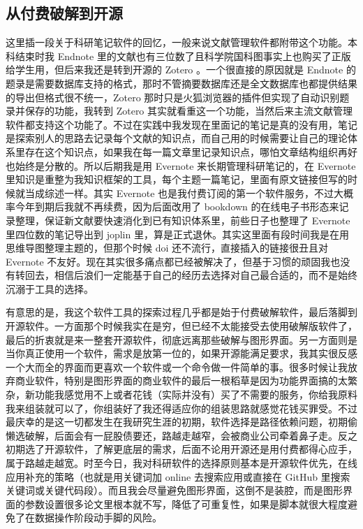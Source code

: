 \documentclass[
]{book}
\begin{document}
\hypertarget{ux4eceux4ed8ux8d39ux7834ux89e3ux5230ux5f00ux6e90}{%
\subsection{从付费破解到开源}\label{ux4eceux4ed8ux8d39ux7834ux89e3ux5230ux5f00ux6e90}}

这里插一段关于科研笔记软件的回忆，一般来说文献管理软件都附带这个功能。本科结束时我 Endnote 里的文献也有三位数了且科学院国科图事实上也购买了正版给学生用，但后来我还是转到开源的 Zotero 。一个很直接的原因就是 Endnote 的题录是需要数据库支持的格式，那时不管摘要数据库还是全文数据库也都提供结果的导出但格式很不统一，Zotero 那时只是火狐浏览器的插件但实现了自动识别题录并保存的功能，我转到 Zotero 其实就看重这一个功能，当然后来主流文献管理软件都支持这个功能了。不过在实践中我发现在里面记的笔记是真的没有用，笔记是探索别人的思路去记录每个文献的知识点，而自己用的时候需要让自己的理论体系里存在这个知识点，如果我在每一篇文章里记录知识点，哪怕文章结构组织再好也始终是分散的。所以后期我是用 Evernote 来长期管理科研笔记的，在 Evernote 里知识是重整为我知识框架的工具，每个主题一篇笔记，里面有原文链接但写的时候就当成综述一样。其实 Evernote 也是我付费订阅的第一个软件服务，不过大概率今年到期后我就不再续费，因为后面改用了 bookdown 的在线电子书形态来记录整理，保证新文献要快速消化到已有知识体系里，前些日子也整理了 Evernote 里四位数的笔记导出到 joplin 里，算是正式退休。其实这里面有段时间我是在用思维导图整理主题的，但那个时候 doi 还不流行，直接插入的链接很丑且对 Evernote 不友好。现在其实很多痛点都已经被解决了，但基于习惯的顽固我也没有转回去，相信后浪们一定能基于自己的经历去选择对自己最合适的，而不是始终沉溺于工具的选择。

有意思的是，我这个软件工具的探索过程几乎都是始于付费破解软件，最后落脚到开源软件。一方面那个时候我实在是穷，但已经不太能接受去使用破解版软件了，最后的折衷就是来一整套开源软件，彻底远离那些破解与图形界面。另一方面则是当你真正使用一个软件，需求是放第一位的，如果开源能满足要求，我其实很反感一个大而全的界面而更喜欢一个软件或一个命令做一件简单的事。很多时候让我放弃商业软件，特别是图形界面的商业软件的最后一根稻草是因为功能界面搞的太繁杂，新功能我感觉用不上或者花钱（实际并没有）买了不需要的服务，你给我原料我来组装就可以了，你组装好了我还得适应你的组装思路就感觉花钱买罪受。不过最庆幸的是这一切都发生在我研究生涯的初期，软件选择是路径依赖问题，初期偷懒选破解，后面会有一屁股债要还，路越走越窄，会被商业公司牵着鼻子走。反之初期选了开源软件，了解更底层的需求，后面不论用开源还是用付费都得心应手，属于路越走越宽。时至今日，我对科研软件的选择原则基本是开源软件优先，在线应用补充的策略（也就是用关键词加 online 去搜索应用或直接在 GitHub 里搜索关键词或关键代码段）。而且我会尽量避免图形界面，这倒不是装腔，而是图形界面的参数设置很多论文里根本就不写，降低了可重复性，如果是脚本就很大程度避免了在数据操作阶段动手脚的风险。
\end{document}
